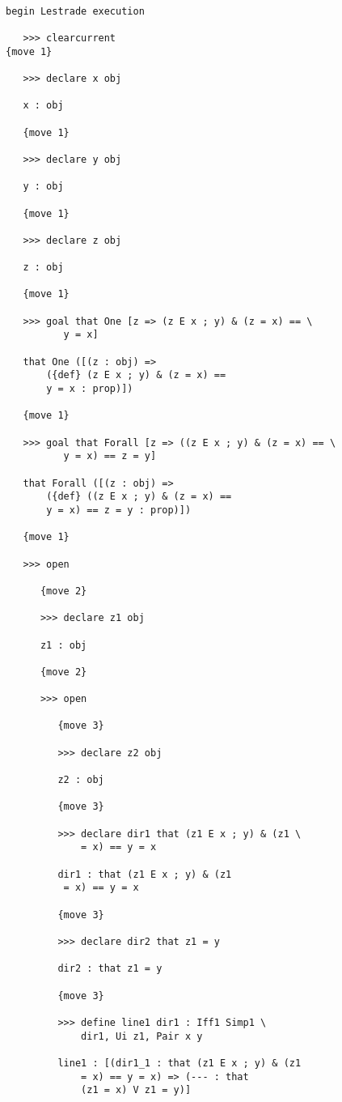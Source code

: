 \documentclass[12pt]{article}
\begin{document}
\begin{verbatim}

begin Lestrade execution

   >>> clearcurrent
{move 1}

   >>> declare x obj

   x : obj

   {move 1}

   >>> declare y obj

   y : obj

   {move 1}

   >>> declare z obj

   z : obj

   {move 1}

   >>> goal that One [z => (z E x ; y) & (z = x) == \
          y = x]

   that One ([(z : obj) => 
       ({def} (z E x ; y) & (z = x) == 
       y = x : prop)])

   {move 1}

   >>> goal that Forall [z => ((z E x ; y) & (z = x) == \
          y = x) == z = y]

   that Forall ([(z : obj) => 
       ({def} ((z E x ; y) & (z = x) == 
       y = x) == z = y : prop)])

   {move 1}

   >>> open

      {move 2}

      >>> declare z1 obj

      z1 : obj

      {move 2}

      >>> open

         {move 3}

         >>> declare z2 obj

         z2 : obj

         {move 3}

         >>> declare dir1 that (z1 E x ; y) & (z1 \
             = x) == y = x

         dir1 : that (z1 E x ; y) & (z1 
          = x) == y = x

         {move 3}

         >>> declare dir2 that z1 = y

         dir2 : that z1 = y

         {move 3}

         >>> define line1 dir1 : Iff1 Simp1 \
             dir1, Ui z1, Pair x y

         line1 : [(dir1_1 : that (z1 E x ; y) & (z1 
             = x) == y = x) => (--- : that 
             (z1 = x) V z1 = y)]


\end{verbatim}
\end{document}
